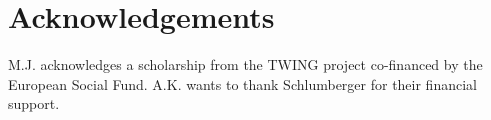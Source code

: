 \documentclass[review,12pt]{elsarticle}
\newcommand{\beq}{\begin{equation}}
\newcommand{\feq}{\end{equation}}
\newcommand{\cstar}{C^{*}}
\begin{document}
\section{Acknowledgements}
M.J. acknowledges a scholarship from the TWING project co-financed by the European Social Fund. A.K. wants to thank Schlumberger for their financial support.

\appendix
\end{document}
